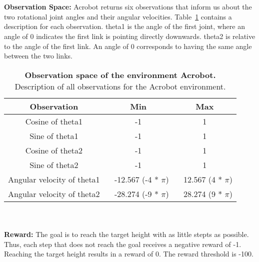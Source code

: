 \\ \\
\textbf{Observation Space:} Acrobot returns six observations that inform us about the two rotational joint angles and their angular velocities. Table~\ref{table:acrobot_obs} contains a description for each observation. theta1 is the angle of the first joint, where an angle of 0 indicates the first link is pointing directly downwards. theta2 is relative to the angle of the first link. An angle of 0 corresponds to having the same angle between the two links.
\begin{table}[!ht]
  \centering
  \begin{tabular}{ |c|c|c| }
    \hline
    Observation & Min & Max \\
    \hline
    Cosine of theta1 & -1 & 1 \\
    Sine of theta1 & -1 & 1 \\
    Cosine of theta2 & -1 & 1 \\
    Sine of theta2 & -1 & 1 \\
    Angular velocity of theta1 & ~ -12.567 (-4 * $\pi$) & ~ 12.567 (4 * $\pi$) \\
    Angular velocity of theta2 & ~ -28.274 (-9 * $\pi$) & ~ 28.274 (9 * $\pi$) \\
    \hline
  \end{tabular}
  \caption[Observation space of the environment Acrobot]{
    \textbf{Observation space of the environment Acrobot.}
    Description of all observations for the Acrobot environment.
  }
  \label{table:acrobot_obs}
\end{table}
\\ \\
\textbf{Reward:} The goal is to reach the target height with as little stepts as possible. Thus, each step that does not reach the goal receives a negative reward of -1. Reaching the target height results in a reward of 0. The reward threshold is -100.


